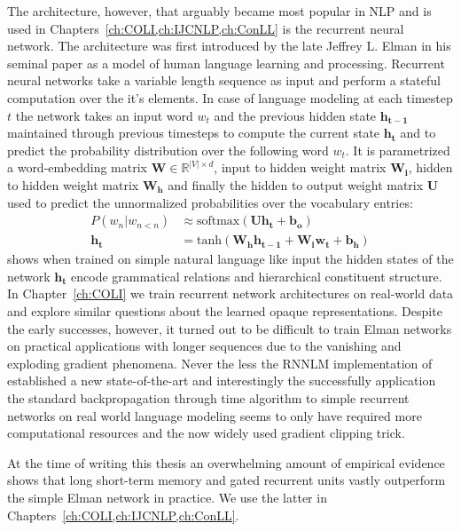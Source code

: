 The architecture, however, that arguably became most popular in NLP and is used in
Chapters~\ref{ch:COLI,ch:IJCNLP,ch:ConLL} is the recurrent neural network. The architecture was
first introduced by the late Jeffrey L. Elman in his seminal paper \citep{elman1990finding}
as a model of human language learning and processing. Recurrent neural networks
take a variable length sequence as input and perform a stateful computation over the it's elements.
In case of language modeling at each timestep $t$ the network takes an input word $w_t$
and the previous hidden state $\mathbf{h_{t-1}}$ maintained through previous timesteps to compute the current
state $\mathbf{h_t}$ and to predict the probability distribution over the following word $w_t$.
It is parametrized a word-embedding matrix $\mathbf{W} \in \mathbb{R}^{|V| \times d}$, input to hidden weight
matrix $\mathbf{W_i}$, hidden to hidden weight matrix $\mathbf{W_h}$ and finally the hidden to output
weight matrix $\mathbf{U}$ used to predict the unnormalized probabilities over the vocabulary entries:
\begin{align}
P(w_n|w_{n<n}) &\approx \text{softmax}(\mathbf{U} \mathbf{h_t} + \mathbf{b_o}) \\
\mathbf{h_t} &= \text{tanh}(\mathbf{W_h}\mathbf{h_{t-1}} + \mathbf{W_i}\mathbf{w_t} + \mathbf{b_h})
\end{align}
\cite{elman1991distributed} shows when trained on simple natural language like input the
hidden states of the network $\mathbf{h_t}$ encode grammatical relations and hierarchical
constituent structure. In Chapter~\ref{ch:COLI} we train recurrent network architectures
on real-world data and explore similar questions about the learned opaque representations.
Despite the early successes, however, it turned out to be difficult to train
Elman networks on practical applications with longer sequences
\cite{bengio1994learning} due to the vanishing and exploding gradient phenomena.
Never the less the RNNLM implementation of \cite{mikolov2010recurrent}
established a new state-of-the-art and interestingly the successfully
application the standard backpropagation through time algorithm  \cite{williams1995gradient}
to simple recurrent networks on real world language modeling \cite{mikolov2012statistical}
seems to only have required more computational resources and the now widely used gradient clipping trick.

At the time of writing this thesis an overwhelming amount of empirical evidence
shows that long short-term memory \cite{hochreiter1997long,gers1999learning}
and gated recurrent units \cite{cho2014learning}
vastly outperform the simple Elman network in practice. We use the latter in
Chapters~\ref{ch:COLI,ch:IJCNLP,ch:ConLL}.

